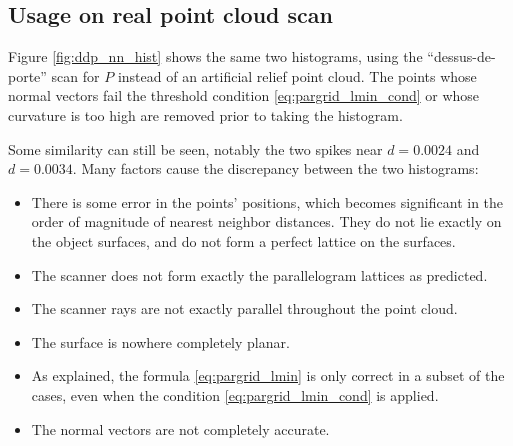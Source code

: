 \subsection{Usage on real point cloud scan}
Figure \ref{fig:ddp_nn_hist} shows the same two histograms, using the ``dessus-de-porte'' scan for $P$ instead of an artificial relief point cloud. The points whose normal vectors fail the threshold condition \ref{eq:pargrid_lmin_cond} or whose curvature is too high are removed prior to taking the histogram.

Some similarity can still be seen, notably the two spikes near $d = 0.0024$ and $d = 0.0034$. Many factors cause the discrepancy between the two histograms:
\begin{itemize}
\item There is some error in the points' positions, which becomes significant in the order of magnitude of nearest neighbor distances. They do not lie exactly on the object surfaces, and do not form a perfect lattice on the surfaces.
\item The scanner does not form exactly the parallelogram lattices as predicted.
\item The scanner rays are not exactly parallel throughout the point cloud.
\item The surface is nowhere completely planar.
\item As explained, the formula \ref{eq:pargrid_lmin} is only correct in a subset of the cases, even when the condition \ref{eq:pargrid_lmin_cond} is applied.
\item The normal vectors are not completely accurate.
\end{itemize}

